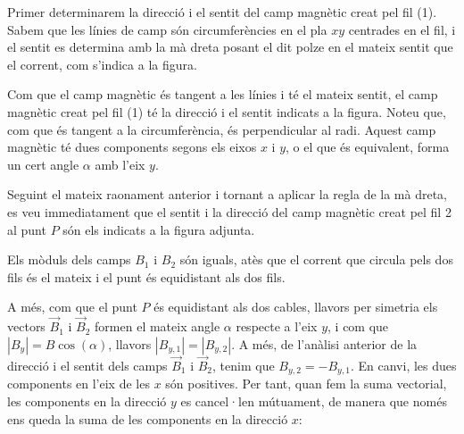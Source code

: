 \begin{solapartat}
 Primer determinarem la direcció i el sentit del camp magnètic creat pel fil (1). Sabem que les línies de camp són circumferències en el pla $xy$ centrades en el fil, i el sentit es determina amb la mà dreta posant el dit polze en el mateix sentit que el corrent, com s'indica a la figura.


Com que el camp magnètic és tangent a les línies i té el mateix sentit, el camp magnètic creat pel fil (1) té la direcció i el sentit indicats a la figura. Noteu que, com que és tangent a la circumferència, és perpendicular al radi. Aquest camp magnètic té dues components segons els eixos $x$ i $y$, o el que és equivalent, forma un cert angle $\alpha$ amb l'eix $y$.


 Seguint el mateix raonament anterior i tornant a aplicar la regla de la mà dreta, es veu immediatament que el sentit i la direcció del camp magnètic creat pel fil 2 al punt $P$ són els indicats a la figura adjunta.


 Els mòduls dels camps $B_1$ i $B_2$ són iguals, atès que el corrent que circula pels dos fils és el mateix i el punt és equidistant als dos fils.

 A més, com que el punt $P$ és equidistant als dos cables, llavors per simetria els vectors $\vec{B}_1$ i $\vec{B}_2$ formen el mateix angle $\alpha$ respecte a l'eix $y$, i com que $|B_y| = B\cos(\alpha)$, llavors $|B_{y,1}| = |B_{y,2}|$. A més, de l'anàlisi anterior de la direcció i el sentit dels camps $\vec{B}_1$ i $\vec{B}_2$, tenim que $B_{y,2} = -B_{y,1}$. En canvi, les dues components en l'eix de les $x$ són positives. Per tant, quan fem la suma vectorial, les components en la direcció $y$ es cancel·len mútuament, de manera que només ens queda la suma de les components en la direcció $x$:

\end{solapartat}

